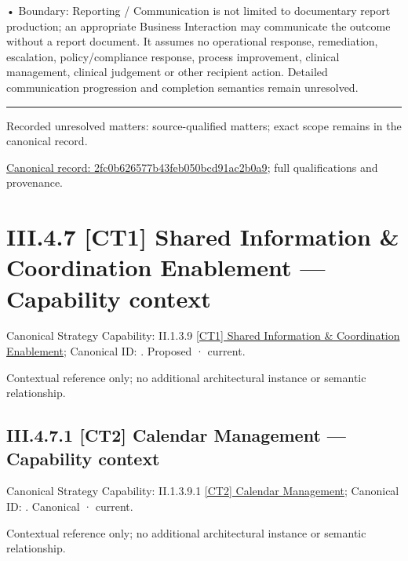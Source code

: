 •
Boundary: Reporting / Communication is not limited to documentary report production; an appropriate Business Interaction may communicate the outcome without a report document. It assumes no operational response, remediation, escalation, policy/compliance response, process improvement, clinical management, clinical judgement or other recipient action. Detailed communication progression and completion semantics remain unresolved.



\medskip\hrule\medskip

{\small Recorded unresolved matters: source-qualified matters; exact scope remains in the canonical record.}\par
{\footnotesize \href{../../../../../../../continuum/business/business-process/2fc0b626577b43feb050bcd91ac2b0a9.md}{Canonical record: 2fc0b626577b43feb050bcd91ac2b0a9}; full qualifications and provenance.}\par
\section*{III.4.7 [CT1] Shared Information \& Coordination Enablement — Capability context}
\label{navigation:III.4.7}

{\small Canonical Strategy Capability: II.1.3.9 \hyperref[element:0062fcacae1740988b6be2bda2aa1674]{[CT1] Shared Information \& Coordination Enablement}; Canonical ID: \texttt{}. Proposed · current.}\par
Contextual reference only; no additional architectural instance or semantic relationship.\par
\subsection*{III.4.7.1 [CT2] Calendar Management — Capability context}
\label{navigation:III.4.7.1}

{\small Canonical Strategy Capability: II.1.3.9.1 \hyperref[element:7669036f7e6749219412fc64df5f7064]{[CT2] Calendar Management}; Canonical ID: \texttt{}. Canonical · current.}\par
Contextual reference only; no additional architectural instance or semantic relationship.\par
